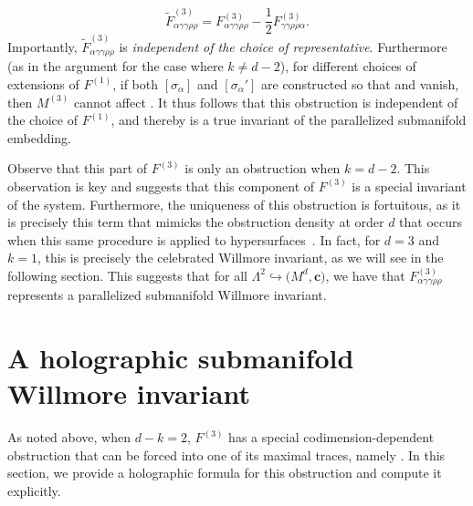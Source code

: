 \documentclass[pdftex]{sigma}
\numberwithin{equation}{section}
\newcommand{\cc}{\boldsymbol{c}}
\renewcommand{\=}{\stackrel \Lambda =}
\begin{document}
\[\tilde{F}^{(3)}_{\alpha \gamma \gamma \rho \rho} = F^{(3)}_{\alpha \gamma \gamma \rho \rho} - \frac{1}{2} F^{(3)}_{\gamma \gamma \rho \rho \alpha} .\]
Importantly, $\tilde{F}^{(3)}_{\alpha \gamma \gamma \rho \rho}$ is \textit{independent of the choice of representative}. Furthermore (as in the argument for the case where $k \neq d-2$), for different choices of extensions of $F^{(1)}$, if both $[\sigma_{\alpha}]$ and $[\sigma_{\alpha}']$ are constructed so that  and  vanish, then $M^{(3)}$ cannot affect . It thus follows that this obstruction is independent of the choice of $F^{(1)}$, and thereby is a true invariant of the parallelized submanifold embedding.

Observe that this part of $F^{(3)}$ is only an obstruction when $k=d-2$. This observation is key and suggests that this component of $F^{(3)}$ is a special invariant of the system. Furthermore, the uniqueness of this obstruction is fortuitous, as it is precisely this term that mimicks the obstruction density at order $d$ that occurs when this same procedure is applied to hypersurfaces~\cite{Will1}. In fact, for $d=3$ and $k=1$, this is precisely the celebrated Willmore invariant, as we will see in the following section. This suggests that for all $\Lambda^2 \hookrightarrow\bigl(M^d,\cc\bigr)$, we have that $F^{(3)}_{\alpha \gamma \gamma \rho \rho}$ represents a parallelized submanifold Willmore invariant.

\section{A holographic submanifold Willmore invariant} \label{Willmore-section}
As noted above, when $d-k=2$, $F^{(3)}$ has a special codimension-dependent obstruction that can be forced into one of its maximal traces, namely . In this section, we provide a holographic formula for this obstruction and compute it explicitly.
\end{document}
